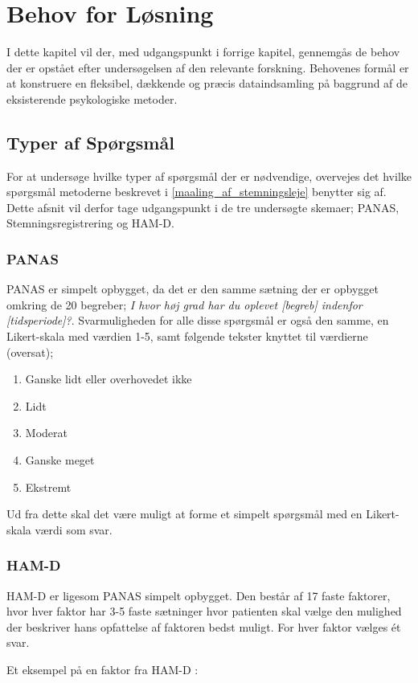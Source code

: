 \chapter{Behov for Løsning}
I dette kapitel vil der, med udgangspunkt i forrige kapitel, gennemgås de behov der er opstået efter undersøgelsen af den relevante forskning.
Behovenes formål er at konstruere en fleksibel, dækkende og præcis dataindsamling på baggrund af de eksisterende psykologiske metoder.

\section{Typer af Spørgsmål}
For at undersøge hvilke typer af spørgsmål der er nødvendige, overvejes det hvilke spørgsmål metoderne beskrevet i \cref{maaling_af_stemningsleje} benytter sig af.
Dette afsnit vil derfor tage udgangspunkt i de tre undersøgte skemaer; PANAS, Stemningsregistrering og HAM-D.

\subsection{PANAS} 
PANAS er simpelt opbygget, da det er den samme sætning der er opbygget omkring de 20 begreber; \textit{I hvor høj grad har du oplevet [begreb] indenfor [tidsperiode]?}.
Svarmuligheden for alle disse spørgsmål er også den samme, en Likert-skala\cite{likert} med værdien 1-5, samt følgende tekster knyttet til værdierne (oversat);
\begin{enumerate}
\item Ganske lidt eller overhovedet ikke
\item Lidt
\item Moderat
\item Ganske meget
\item Ekstremt
\end{enumerate}

Ud fra dette skal det være muligt at forme et simpelt spørgsmål med en Likert-skala værdi som svar.

\subsection{HAM-D} 
HAM-D er ligesom PANAS simpelt opbygget.
Den består af 17 faste faktorer, hvor hver faktor har 3-5 faste sætninger hvor patienten skal vælge den mulighed der beskriver hans opfattelse af faktoren bedst muligt.
For hver faktor vælges ét svar.

Et eksempel på en faktor fra HAM-D \cite{ham_d}:\\

